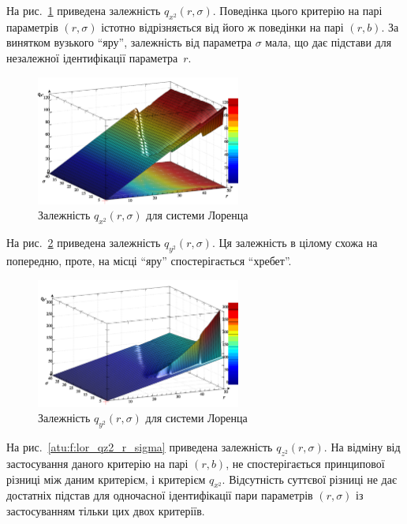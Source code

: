 На рис.~\ref{atu:f:lor_qx2_r_sigma} приведена залежність
$q_{x^2}(r,\sigma)$.
Поведінка цього критерію на парі параметрів
$ (r, \sigma) $ істотно відрізняється від його ж поведінки на парі
$ (r, b) $. За винятком вузького ``яру'', залежність від параметра
$ \sigma $ мала, що дає підстави для незалежної ідентифікації
параметра~$r$.

\begin{figure}[ht!]
  \begin{center}
    \includegraphics[width=0.60\textwidth]{p/cha/lor/q2d/lor_qx2_r_sigma.png}
  \end{center}
  \caption{Залежність $ q_{x^2} (r, \sigma) $ для системи Лоренца}
  \label{atu:f:lor_qx2_r_sigma}
\end{figure}


На рис.~\ref{atu:f:lor_qy2_r_sigma} приведена залежність
$q_{y^2}(r,\sigma)$.
Ця залежність в цілому схожа на попередню, проте, на місці ``яру'' спостерігається ``хребет''.

\begin{figure}[ht!]
  \begin{center}
    \includegraphics[width=0.60\textwidth]{p/cha/lor/q2d/lor_qy2_r_sigma.png}
  \end{center}
  \caption{Залежність $ q_{y^2} (r, \sigma) $ для системи Лоренца}
  \label{atu:f:lor_qy2_r_sigma}
\end{figure}

На рис.~\ref{atu:f:lor_qz2_r_sigma} приведена залежність
$ q_{z^2} (r, \sigma) $. На відміну від застосування даного критерію
на парі
$ (r, b) $, не спостерігається принципової різниці між даним
критерієм, і критерієм
$ q_{x^2} $. Відсутність суттєвої різниці не дає достатніх підстав
для одночасної ідентифікації пари параметрів
$ (r, \sigma) $ із застосуванням тільки цих двох критеріїв.


